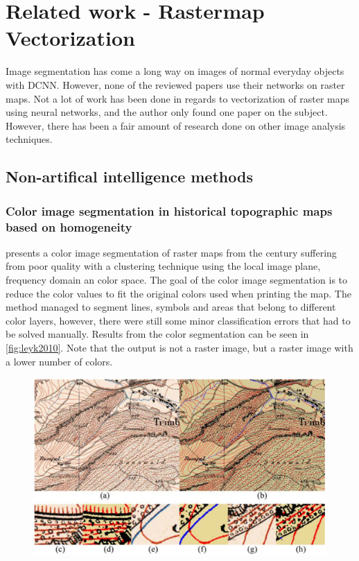 \chapter{Related work - Rastermap Vectorization}
Image segmentation has come a long way on images of normal everyday objects with DCNN. However, none of the reviewed papers use their networks on raster maps. Not a lot of work has been done in regards to vectorization of raster maps using neural networks, and the author only found one paper on the subject. However, there has been a fair amount of research done on other image analysis techniques.

\section{Non-artifical intelligence methods}

\subsection{Color image segmentation in historical topographic maps based on homogeneity}
\citet{Leyk2010} presents a color image segmentation of raster maps from the  century suffering from poor quality with a clustering technique using the local image plane, frequency domain an color space. The goal of the color image segmentation is to reduce the color values to fit the original colors used when printing the map. The method managed to segment lines, symbols and areas that belong to different color layers, however, there were still some minor classification errors that had to be solved manually. Results from the color segmentation can be seen in \autoref{fig:leyk2010}. Note that the output is not a raster image, but a raster image with a lower number of colors.

\begin{figure}[H]
    \centering
    \includegraphics[width=0.8\linewidth]{fig/leyk2010.png}
    \label{fig:leyk2010}
\end{figure}

